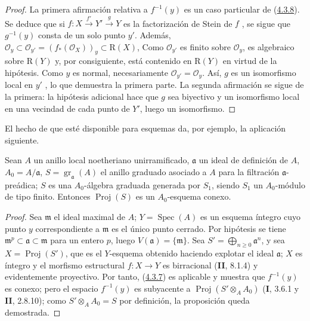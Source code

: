 \begin{proof}
La primera afirmación relativa a $f^{-1}(y)$ es un caso particular de (\hyperref[III.4.3.8-fr]{4.3.8}). Se
deduce que si $f:X\xrightarrow{f'}Y'\xrightarrow{g}Y$
es la factorización de Stein de $f$ , se sigue que
$g^{-1}(y)$ consta de un solo punto $y'$. Además,
$\mathcal O_y\subset\mathcal O_{y'}=(f_*(\mathcal O_X))_y
\subset\mathrm R(X)$,
Como $\mathcal O_{y'}$ es finito sobre $\mathcal O_y$, es algebraico sobre $\mathrm R(Y)$ y, por consiguiente, está contenido en $\mathrm R(Y)$ en virtud de la hipótesis. Como $y$ es normal, necesariamente
$\mathcal O_{y'}=\mathcal O_y$. Así, $g$ es un isomorfismo local en $y'$
, lo que demuestra la primera parte. La segunda
afirmación se sigue de la primera: la hipótesis adicional hace que $g$
sea biyectivo y un isomorfismo local en una vecindad de cada punto de
$Y'$, luego un isomorfismo.
\end{proof}

El hecho de que  esté disponible para esquemas da, por
ejemplo, la aplicación siguiente.

\begin{proposition}[4.3.13]
\label{III.4.3.13-fr}
Sean $A$ un anillo local noetheriano unirramificado, $\mathfrak a$ un ideal de
definición de $A$, $A_0=A/\mathfrak a$,
$S=\operatorname{gr}_{\mathfrak a}(A)$ el anillo graduado asociado a $A$ para
la filtración $\mathfrak a$-preádica; $S$ es una $A_0$-álgebra graduada
generada por $S_1$, siendo $S_1$ un $A_0$-módulo de tipo finito. Entonces
$\operatorname{Proj}(S)$ es un $A_0$-esquema conexo.
\end{proposition}

\begin{proof}
Sea $\mathfrak m$ el ideal maximal de $A$; $Y=\operatorname{Spec}(A)$ es
un esquema íntegro cuyo punto $y$ correspondiente a $\mathfrak m$ es
el único punto cerrado. Por hipótesis se tiene
$\mathfrak m^p\subset\mathfrak a\subset\mathfrak m$ para un entero $p$,
luego $V(\mathfrak a)=\{\mathfrak m\}$. Sea
$S'=\bigoplus_{n\geq0}\mathfrak a^n$, y sea
$X=\operatorname{Proj}(S')$, que es el $Y$-esquema obtenido haciendo explotar
el ideal $\mathfrak a$; $X$ es íntegro y el morfismo estructural
$f:X\to Y$ es birracional (\textbf{II}, 8.1.4) y evidentemente proyectivo. Por tanto,
(\hyperref[III.4.3.7-fr]{4.3.7}) es aplicable y muestra que $f^{-1}(y)$
es conexo; pero el espacio $f^{-1}(y)$ es subyacente a
$\operatorname{Proj}(S'\otimes_AA_0)$ (\textbf{I}, 3.6.1 y \textbf{II}, 2.8.10); como
$S'\otimes_AA_0=S$ por definición, la proposición queda demostrada.
\end{proof}

